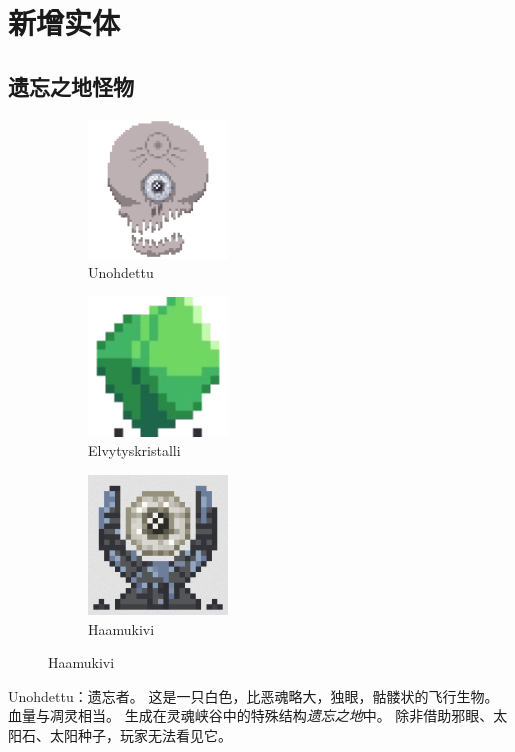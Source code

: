 \documentclass[11pt]{article}
\begin{document}
    \clearpage
    \section{新增实体}\label{sec:new-entities}

    \subsection{遗忘之地怪物}\label{subsec:forgottens}
    \begin{figure}[ht]
        \begin{subfigure}{10em}
            \centering
            \includegraphics[width=10em]{./imgs/Monster_Boss_Ghost}
            \caption{Unohdettu}
        \end{subfigure}
        \begin{subfigure}{10em}
            \centering
            \includegraphics[width=10em]{./imgs/Monster_hpcrystal}
            \caption{Elvytyskristalli}
        \end{subfigure}
        \begin{subfigure}{10em}
            \centering
            \includegraphics[width=10em]{./imgs/Monster_snowcrystal}
            \caption{Haamukivi}
        \end{subfigure}\label{fig:entities}
    \end{figure}
    Unohdettu：遗忘者。
    这是一只白色，比恶魂略大，独眼，骷髅状的飞行生物。血量与凋灵相当。
    生成在灵魂峡谷中的特殊结构\textit{遗忘之地}中。
    除非借助邪眼、太阳石、太阳种子，玩家无法看见它。
\end{document}

